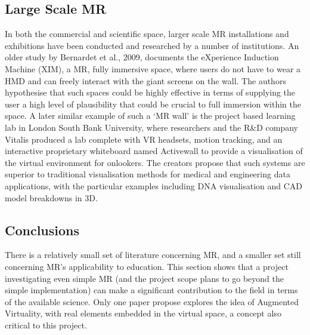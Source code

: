 \documentclass[11pt]{report}
\begin{document}
\subsection{Large Scale MR}
In both the commercial and scientific space, larger scale MR installations and exhibitions have been conducted and researched by a number of institutions. An older study by Bernardet et al., 2009, documents the eXperience Induction Machine (XIM), a MR, fully immersive space, where users do not have to wear a HMD and can freely interact with the giant screens on the wall. The authors hypothesise that such spaces could be highly effective in terms of supplying the user a high level of plausibility that could be crucial to full immersion within the space. A later similar example of such a `MR wall' is the project based learning lab in London South Bank University, where researchers and the R\&D company Vitalis produced a lab complete with VR headsets, motion tracking, and an interactive proprietary whiteboard named Activewall to provide a visualisation of the virtual environment for onlookers. The creators propose that such systems are superior to traditional visualisation methods for medical and engineering data applications, with the particular examples including DNA visualisation and CAD model breakdowns in 3D.
\subsection{Conclusions}
There is a relatively small set of literature concerning MR, and a smaller set still concerning MR's applicability to education. This section shows that a project investigating even simple MR (and the project scope plans to go beyond the simple implementation) can make a significant contribution to the field in terms of the available science. Only one paper propose explores the idea of Augmented Virtuality, with real elements embedded in the virtual space, a concept also critical to this project.
\end{document}
